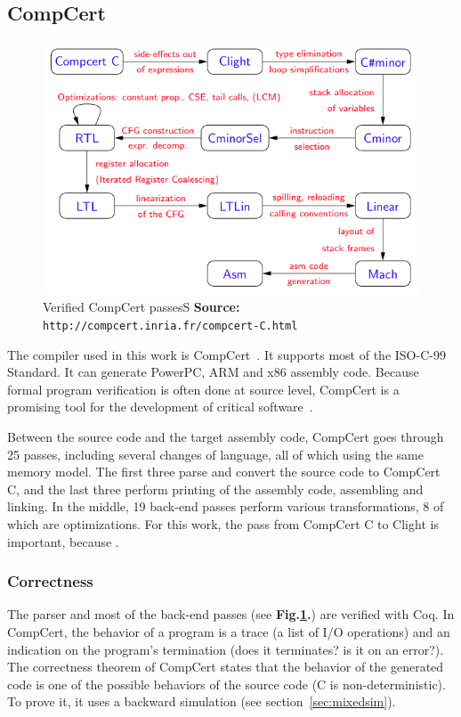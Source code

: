 \subsection{CompCert}
\begin{center}
\begin{figure}
\includegraphics[scale=1]{img/passes.png}
\caption{Verified CompCert passes\hspace{\linewidth}S \textbf{Source: }\texttt{http://compcert.inria.fr/compcert-C.html}}
\label{fig:compcertpasses}
\end{figure}
\end{center}

The compiler used in this work is CompCert~\cite{compcertmanual}.
It supports most of the ISO-C-99 Standard.
It can generate PowerPC, ARM and x86 assembly code.
Because formal program verification is often done at source level, CompCert is a promising tool for the development of critical software~\cite{bedinfranca:hal-00653367}.

Between the source code and the target assembly code, CompCert goes through 25 passes, including several changes of language, all of which using the same memory model.
The first three parse and convert the source code to CompCert C, and the last three perform printing of the assembly code, assembling and linking.
In the middle, 19 back-end passes perform various transformations, 8 of which are optimizations.
For this work, the pass from CompCert C to Clight is important, because .

\subsubsection{Correctness}
The parser and most of the back-end passes (see \textbf{Fig.\ref{fig:compcertpasses}.}) are verified with Coq.
In CompCert, the behavior of a program is a trace (a list of I/O operations) and an indication on the program's termination (does it terminates? is it on an error?). %
The correctness theorem of CompCert states that the behavior of the generated code is one of the possible behaviors of the source code (C is non-deterministic). To prove it, it uses a backward simulation (see section~\ref{sec:mixedsim}).

